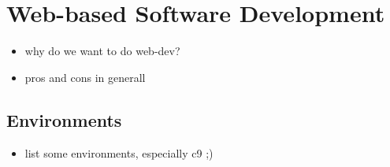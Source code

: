 \section{Web-based Software Development}
\label{sec:Introduction}

\begin{itemize}
	\item why do we want to do web-dev?
	\item pros and cons in generall
\end{itemize}

\subsection{Environments}

\begin{itemize}
	\item list some environments, especially c9 ;)
\end{itemize}